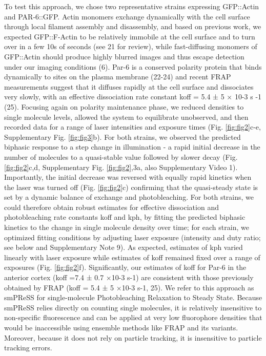  
 
 
 
 To test this approach, we chose two representative strains expressing GFP::Actin and PAR-6::GFP. Actin monomers exchange dynamically with the cell surface through local filament assembly and disassembly, and based on previous work, we expected GFP::F-Actin to be relatively immobile at the cell surface and to turn over in a few 10s of seconds (see 21 for review), while fast-diffusing monomers of GFP::Actin should produce highly blurred images and thus escape detection under our imaging conditions (6). Par-6 is a conserved polarity protein that binds dynamically to sites on the plasma membrane (22-24) and recent FRAP measurements suggest that it diffuses rapidly at the cell surface and dissociates very slowly, with an effective dissociation rate constant koff = 5.4 ± 5 × 10-3 s -1 (25). Focusing again on polarity maintenance phase, we reduced densities to single molecule levels, allowed the system to equilibrate unobserved, and then recorded data for a range of laser intensities and exposure times (Fig. \ref{fig:fig2}c-e, Supplementary Fig. \ref{fig:fig3}b). For both strains, we observed the predicted biphasic response to a step change in illumination - a rapid initial decrease in the number of molecules to a quasi-stable value followed by slower decay (Fig. \ref{fig:fig2}c,d, Supplementary Fig. \ref{fig:fig2},3a, also Supplementary Video 1). Importantly, the initial decrease was reversed with equally rapid kinetics when the laser was turned off (Fig. \ref{fig:fig2}c) confirming that the quasi-steady state is set by a dynamic balance of exchange and photobleaching. For both strains, we could therefore obtain robust estimates for effective dissociation and photobleaching rate constants koff and kph, by fitting the predicted biphasic kinetics to the change in single molecule density over time; for each strain, we optimized fitting conditions by adjusting laser exposure (intensity and duty ratio; see below and Supplementary Note 9). As expected, estimates of kph varied linearly with laser exposure while estimates of koff remained fixed over a range of exposures (Fig. \ref{fig:fig2}f). Significantly, our estimates of koff for Par-6 in the anterior cortex (koff =7.4 ± 0.7 ×10-3 s-1) are consistent with those previously obtained by FRAP (koff = 5.4 ± 5 ×10-3 s-1, 25). We refer to this approach as smPReSS for single-molecule Photobleaching Relaxation to Steady State. Because smPReSS relies directly on counting single molecules, it is relatively insensitive to non-specific fluorescence and can be applied at very low fluorophore densities that would be inaccessible using ensemble methods like FRAP and its variants. Moreover, because it does not rely on particle tracking, it is insensitive to particle tracking errors.
 
